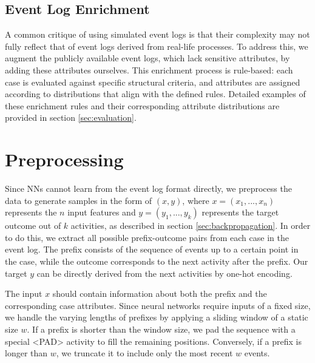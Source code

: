 
\subsection{Event Log Enrichment}
A common critique of using simulated event logs
is that their complexity may not fully reflect that of event logs derived from real-life processes.
To address this, we augment the publicly available event logs, which lack sensitive attributes,
by adding these attributes ourselves.
This enrichment process is rule-based:
each case is evaluated against specific structural criteria,
and attributes are assigned according to distributions that align with the defined rules.
Detailed examples of these enrichment rules
and their corresponding attribute distributions are provided in section \ref{sec:evaluation}.

\section{Preprocessing}
Since NNs cannot learn from the event log format directly,
we preprocess the data to generate samples in the form of $(x,y)$,
where $x = (x_1, ..., x_n)$ represents the $n$ input features and $y = (y_1, ..., y_k)$ represents the target outcome
out of $k$ activities, as described in section \ref{sec:backpropagation}. 
In order to do this, we extract all possible prefix-outcome pairs from each case in the event log.
The prefix consists of the sequence of events up to a certain point in the case,
while the outcome corresponds to the next activity after the prefix.
Our target $y$ can be directly derived from the next activities by one-hot encoding.

The input $x$ should contain information about both the prefix and the corresponding case attributes.
Since neural networks require inputs of a fixed size,
we handle the varying lengths of prefixes by applying a sliding window of a static size $w$.
If a prefix is shorter than the window size,
we pad the sequence with a special <PAD> activity to fill the remaining positions.
Conversely, if a prefix is longer than $w$, we truncate it to include only the most recent $w$ events. 

